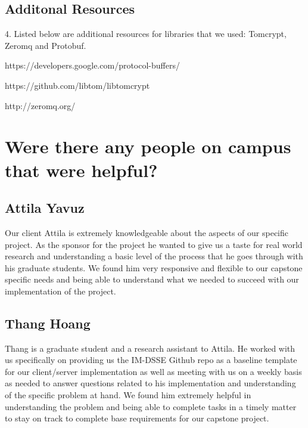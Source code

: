 \subsection{Additonal Resources}
4. Listed below are additional resources for libraries that we used: Tomcrypt, Zeromq and Protobuf.

https://developers.google.com/protocol-buffers/

https://github.com/libtom/libtomcrypt

http://zeromq.org/
 
\section {Were there any people on campus that were helpful?}
\subsection{Attila Yavuz}
Our client Attila is extremely knowledgeable about the aspects of our specific project. As the sponsor for the project he wanted to give us a taste for real world research and understanding a basic level of the process that he goes through with his graduate students. We found him very responsive and flexible to our capstone specific needs and being able to understand what we needed to succeed with our implementation of the project.

\subsection{Thang Hoang}
Thang is a graduate student and a research assistant to Attila. He worked with us specifically on providing us the IM-DSSE Github repo as a baseline template for our client/server implementation as well as meeting with us on a weekly basis as needed to answer questions related to his implementation and understanding of the specific problem at hand. We found him extremely helpful in understanding the problem and being able to complete tasks in a timely matter to stay on track to complete base requirements for our capstone project.
